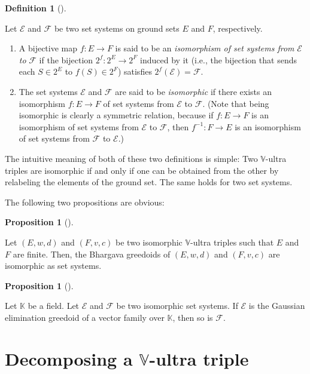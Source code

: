 \documentclass[numbers=enddot,12pt,final,onecolumn,notitlepage]{scrartcl}%
\theoremstyle{definition}
\newtheorem{prop}[theo]{Proposition}
\newenvironment{proposition}[1][]
{\begin{prop}[#1]\begin{leftbar}}
{\end{leftbar}\end{prop}}
\newtheorem{defi}[theo]{Definition}
\newenvironment{definition}[1][]
{\begin{defi}[#1]\begin{leftbar}}
{\end{leftbar}\end{defi}}
\theoremstyle{plainsl}
\begin{document}
\begin{definition}
Let $\mathcal{E}$ and $\mathcal{F}$ be two set systems on ground sets $E$ and
$F$, respectively.

\begin{enumerate}
\item[\textbf{(a)}] A bijective map $f:E\rightarrow F$ is said to be an
\textit{isomorphism of set systems from }$\mathcal{E}$ \textit{to
}$\mathcal{F}$ if the bijection $2^{f}:2^{E}\rightarrow2^{F}$ induced by it
(i.e., the bijection that sends each $S\in2^{E}$ to $f\left(  S\right)
\in2^{F}$) satisfies $2^{f}\left(  \mathcal{E}\right)  =\mathcal{F}$.

\item[\textbf{(b)}] The set systems $\mathcal{E}$ and $\mathcal{F}$ are said
to be \textit{isomorphic} if there exists an isomorphism $f:E\rightarrow F$ of
set systems from $\mathcal{E}$ to $\mathcal{F}$. (Note that being isomorphic
is clearly a symmetric relation, because if $f:E\rightarrow F$ is an
isomorphism of set systems from $\mathcal{E}$ to $\mathcal{F}$, then
$f^{-1}:F\rightarrow E$ is an isomorphism of set systems from $\mathcal{F}$ to
$\mathcal{E}$.)
\end{enumerate}
\end{definition}

The intuitive meaning of both of these two definitions is simple: Two
$\mathbb{V}$-ultra triples are isomorphic if and only if one can be obtained
from the other by relabeling the elements of the ground set. The same holds
for two set systems.

The following two propositions are obvious:

\begin{proposition}
\label{prop.iso.bh-gr}Let $\left(  E,w,d\right)  $ and $\left(  F,v,c\right)
$ be two isomorphic $\mathbb{V}$-ultra triples such that $E$ and $F$ are
finite. Then, the Bhargava greedoids of $\left(  E,w,d\right)  $ and $\left(
F,v,c\right)  $ are isomorphic as set systems.
\end{proposition}

\begin{proposition}
\label{prop.iso.gauss}Let $\mathbb{K}$ be a field. Let $\mathcal{E}$ and
$\mathcal{F}$ be two isomorphic set systems. If $\mathcal{E}$ is the Gaussian
elimination greedoid of a vector family over $\mathbb{K}$, then so is
$\mathcal{F}$.
\end{proposition}

\section{\label{sect.cliques}Decomposing a $\mathbb{V}$-ultra triple}
\end{document}
